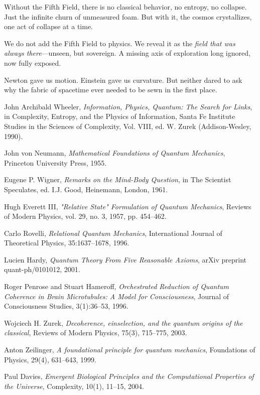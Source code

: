 Without the Fifth Field, there is no classical behavior, no entropy, no collapse. Just the infinite churn of unmeasured foam. But with it, the cosmos crystallizes, one act of collapse at a time.

We do not add the Fifth Field to physics. We reveal it as the \textit{field that was always there}—unseen, but sovereign. A missing axis of exploration long ignored, now fully exposed.

Newton gave us motion. Einstein gave us curvature. But neither dared to ask why the fabric of spacetime ever needed to be sewn in the first place.

\begin{thebibliography}{12}

John Archibald Wheeler, \textit{Information, Physics, Quantum: The Search for Links}, in Complexity, Entropy, and the Physics of Information, Santa Fe Institute Studies in the Sciences of Complexity, Vol. VIII, ed. W. Zurek (Addison-Wesley, 1990).

John von Neumann, \textit{Mathematical Foundations of Quantum Mechanics}, Princeton University Press, 1955.

Eugene P. Wigner, \textit{Remarks on the Mind-Body Question}, in The Scientist Speculates, ed. I.J. Good, Heinemann, London, 1961.

Hugh Everett III, \textit{"Relative State" Formulation of Quantum Mechanics}, Reviews of Modern Physics, vol. 29, no. 3, 1957, pp. 454–462.

Carlo Rovelli, \textit{Relational Quantum Mechanics}, International Journal of Theoretical Physics, 35:1637–1678, 1996.

Lucien Hardy, \textit{Quantum Theory From Five Reasonable Axioms}, arXiv preprint quant-ph/0101012, 2001.

Roger Penrose and Stuart Hameroff, \textit{Orchestrated Reduction of Quantum Coherence in Brain Microtubules: A Model for Consciousness}, Journal of Consciousness Studies, 3(1):36–53, 1996.

Wojciech H. Zurek, \textit{Decoherence, einselection, and the quantum origins of the classical}, Reviews of Modern Physics, 75(3), 715–775, 2003.

Anton Zeilinger, \textit{A foundational principle for quantum mechanics}, Foundations of Physics, 29(4), 631–643, 1999.

Paul Davies, \textit{Emergent Biological Principles and the Computational Properties of the Universe}, Complexity, 10(1), 11–15, 2004.

\end{thebibliography}
